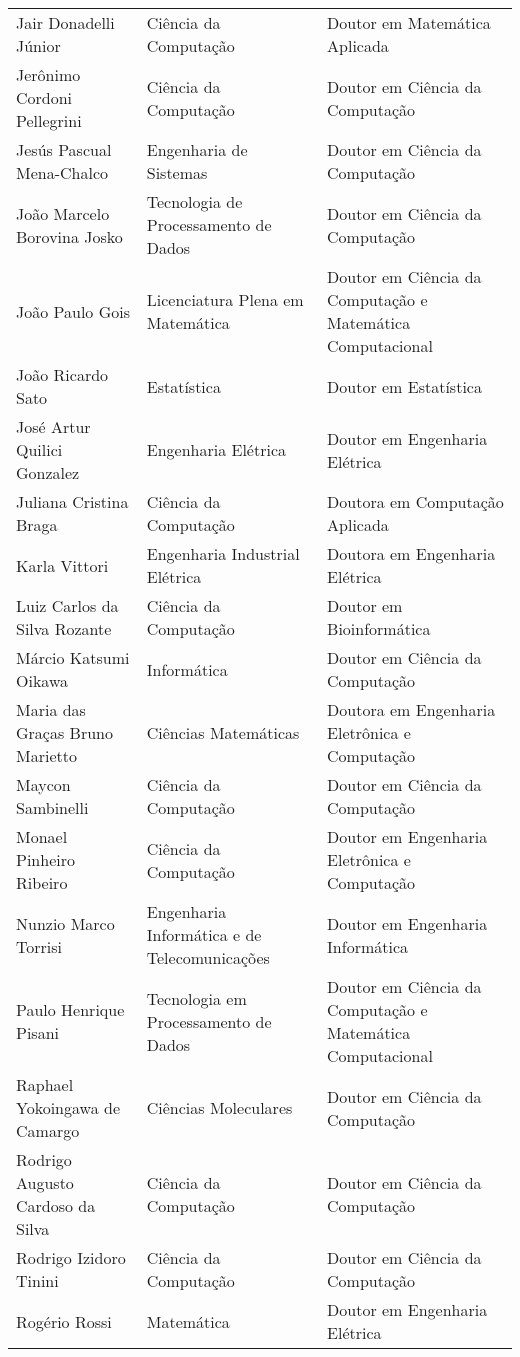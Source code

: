 {\begin{longtable}{|p{}|p{}|p{}|}
    Jair Donadelli Júnior & Ciência da Computação & Doutor em Matemática Aplicada \\
    Jerônimo Cordoni Pellegrini & Ciência da Computação & Doutor em Ciência da Computação \\
    Jesús Pascual Mena-Chalco & Engenharia de Sistemas & Doutor em Ciência da Computação \\
    João Marcelo Borovina Josko & Tecnologia de Processamento de Dados & Doutor em Ciência da Computação \\
    João Paulo Gois & Licenciatura Plena em Matemática & Doutor em Ciência da Computação e Matemática Computacional \\
    João Ricardo Sato & Estatística & Doutor em Estatística \\
    José Artur Quilici Gonzalez & Engenharia Elétrica & Doutor em Engenharia Elétrica \\
    Juliana Cristina Braga & Ciência da Computação & Doutora em Computação Aplicada \\
    Karla Vittori & Engenharia Industrial Elétrica & Doutora em Engenharia Elétrica \\
    Luiz Carlos da Silva Rozante & Ciência da Computação & Doutor em Bioinformática \\
    Márcio Katsumi Oikawa & Informática & Doutor em Ciência da Computação \\
    Maria das Graças Bruno Marietto & Ciências Matemáticas & Doutora em Engenharia Eletrônica e Computação \\
    Maycon Sambinelli & Ciência da Computação & Doutor em Ciência da Computação \\
    Monael Pinheiro Ribeiro & Ciência da Computação & Doutor em Engenharia Eletrônica e Computação \\
    Nunzio Marco Torrisi & Engenharia Informática e de Telecomunicações & Doutor em Engenharia Informática \\
    Paulo Henrique Pisani & Tecnologia em Processamento de Dados & Doutor em Ciência da Computação e Matemática Computacional \\
    Raphael Yokoingawa de Camargo & Ciências Moleculares & Doutor em Ciência da Computação \\
    Rodrigo Augusto Cardoso da Silva & Ciência da Computação & Doutor em Ciência da Computação \\
    Rodrigo Izidoro Tinini & Ciência da Computação & Doutor em Ciência da Computação \\
    Rogério Rossi & Matemática & Doutor em Engenharia Elétrica \\

\end{longtable}}
